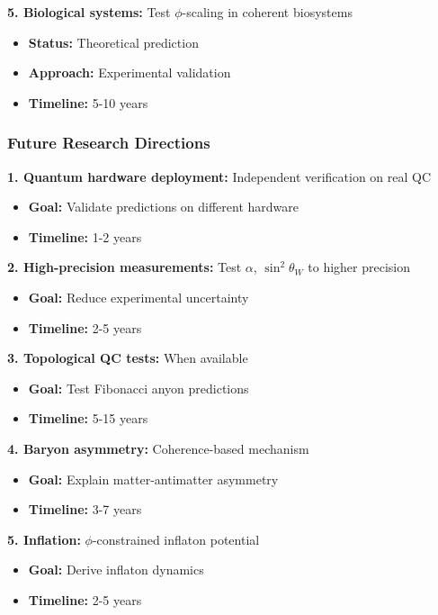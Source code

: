 \documentclass[11pt]{article}
\theoremstyle{definition}
\newcommand{\goldenratio}{\phi}
\begin{document}
\textbf{5. Biological systems:} Test $\goldenratio$-scaling in coherent biosystems
\begin{itemize}
\item \textbf{Status:} Theoretical prediction
\item \textbf{Approach:} Experimental validation
\item \textbf{Timeline:} 5-10 years
\end{itemize}

\subsubsection{Future Research Directions}

\textbf{1. Quantum hardware deployment:} Independent verification on real QC
\begin{itemize}
\item \textbf{Goal:} Validate predictions on different hardware
\item \textbf{Timeline:} 1-2 years
\end{itemize}

\textbf{2. High-precision measurements:} Test $\alpha$, $\sin^2\theta_W$ to higher precision
\begin{itemize}
\item \textbf{Goal:} Reduce experimental uncertainty
\item \textbf{Timeline:} 2-5 years
\end{itemize}

\textbf{3. Topological QC tests:} When available
\begin{itemize}
\item \textbf{Goal:} Test Fibonacci anyon predictions
\item \textbf{Timeline:} 5-15 years
\end{itemize}

\textbf{4. Baryon asymmetry:} Coherence-based mechanism
\begin{itemize}
\item \textbf{Goal:} Explain matter-antimatter asymmetry
\item \textbf{Timeline:} 3-7 years
\end{itemize}

\textbf{5. Inflation:} $\goldenratio$-constrained inflaton potential
\begin{itemize}
\item \textbf{Goal:} Derive inflaton dynamics
\item \textbf{Timeline:} 2-5 years
\end{itemize}
\end{document}
